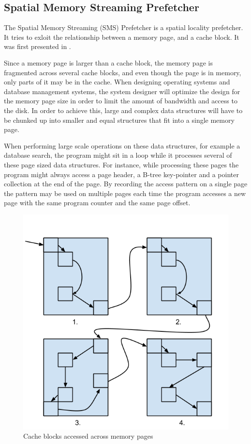 \subsection{Spatial Memory Streaming Prefetcher}
\label{sec:smsPrefetcher}

The Spatial Memory Streaming (SMS) Prefetcher is a spatial locality
prefetcher. It tries to exloit the relationship between a memory page, and a cache block. It was first presented in \cite{SMS}.

Since a memory page is larger than a cache block, the memory page is
fragmented across several cache blocks, and even though the page is in
memory, only parts of it may be in the cache.  When designing
operating systems and database management systems, the system designer
will optimize the design for the memory page size in order to limit
the amount of bandwidth and access to the disk. In order to achieve
this, large and complex data structures will have to be chunked up into
smaller and equal structures that fit into a single memory page.

When performing large scale operations on these data structures, for
example a database search, the program might sit in a loop while it
processes several of these page sized data structures. For instance,
while processing these pages the program might always access a page
header, a B-tree key-pointer and a pointer collection at the end of
the page. By recording the access pattern on a single page the pattern may
be used on multiple pages each time the program accesses a new page
with the same program counter and the same page offset.

\begin{figure}[H]
  \centering
  \includegraphics[scale=0.35]{./figures/sms_pattern.png}
  \caption{Cache blocks accessed across memory pages}
  \label{fig:sms_pattern}
\end{figure}

